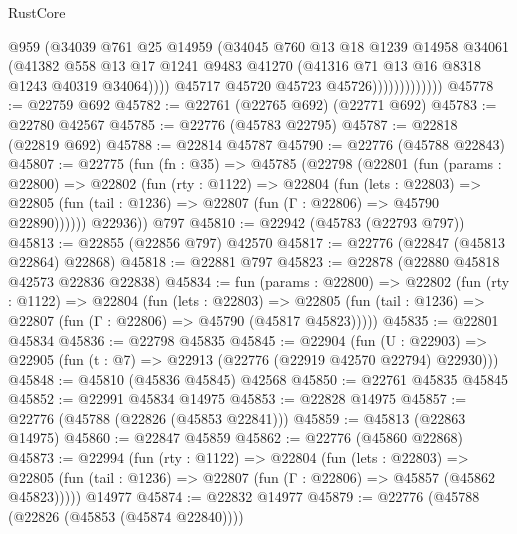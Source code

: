 \begin{lexlean}{RustCore}
\begin{coremodule}
                              @959
                              (@34039
                                @761
                                @25
                                @14959
                                (@34045
                                  @760
                                  @13
                                  @18
                                  @1239
                                  @14958
                                  @34061
                                  (@41382
                                    @558
                                    @13
                                    @17
                                    @1241
                                    @9483
                                    @41270
                                    (@41316 @71 @13 @16 @8318 @1243 @40319 @34064))))
                              @45717
                              @45720
                              @45723
                              @45726)))))))))))))
@45778 := @22759 @692
@45782 := @22761 (@22765 @692) (@22771 @692)
@45783 := @22780 @42567
@45785 := @22776 (@45783 @22795)
@45787 := @22818 (@22819 @692)
@45788 := @22814 @45787
@45790 := @22776 (@45788 @22843)
@45807 := @22775
    (fun (fn : @35) =>
    @45785
      (@22798
        (@22801
          (fun (params : @22800) =>
          @22802
            (fun (rty : @1122) =>
            @22804
              (fun (lets : @22803) =>
              @22805 (fun (tail : @1236) => @22807 (fun (Γ : @22806) => @45790 @22890))))))
        @22936))
    @797
@45810 := @22942 (@45783 (@22793 @797))
@45813 := @22855 (@22856 @797) @42570
@45817 := @22776 (@22847 (@45813 @22864) @22868)
@45818 := @22881 @797
@45823 := @22878 (@22880 @45818 @42573 @22836 @22838)
@45834 := fun (params : @22800) =>
  @22802
    (fun (rty : @1122) =>
    @22804
      (fun (lets : @22803) =>
      @22805 (fun (tail : @1236) => @22807 (fun (Γ : @22806) => @45790 (@45817 @45823)))))
@45835 := @22801 @45834
@45836 := @22798 @45835
@45845 := @22904
    (fun (U : @22903) => @22905 (fun (t : @7) => @22913 (@22776 (@22919 @42570 @22794) @22930)))
@45848 := @45810 (@45836 @45845) @42568
@45850 := @22761 @45835 @45845
@45852 := @22991 @45834 @14975
@45853 := @22828 @14975
@45857 := @22776 (@45788 (@22826 (@45853 @22841)))
@45859 := @45813 (@22863 @14975)
@45860 := @22847 @45859
@45862 := @22776 (@45860 @22868)
@45873 := @22994
    (fun (rty : @1122) =>
    @22804
      (fun (lets : @22803) =>
      @22805 (fun (tail : @1236) => @22807 (fun (Γ : @22806) => @45857 (@45862 @45823)))))
    @14977
@45874 := @22832 @14977
@45879 := @22776 (@45788 (@22826 (@45853 (@45874 @22840))))

\end{coremodule}
\end{lexlean}
